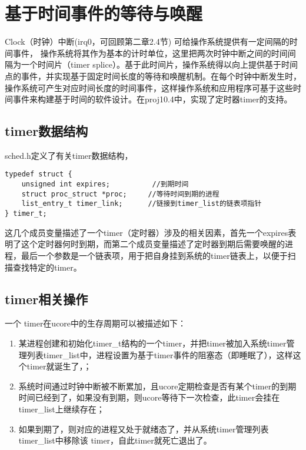 \section{基于时间事件的等待与唤醒}\label{ux57faux4e8eux65f6ux95f4ux4e8bux4ef6ux7684ux7b49ux5f85ux4e0eux5524ux9192}

Clock（时钟）中断(irq0，可回顾第二章2.4节)
可给操作系统提供有一定间隔的时间事件，
操作系统将其作为基本的计时单位，这里把两次时钟中断之间的时间间隔为一个时间片（timer
splice）。基于此时间片，操作系统得以向上提供基于时间点的事件，并实现基于固定时间长度的等待和唤醒机制。在每个时钟中断发生时，操作系统可产生对应时间长度的时间事件，这样操作系统和应用程序可基于这些时间事件来构建基于时间的软件设计。在proj10.4中，实现了定时器timer的支持。

\subsection{timer数据结构}\label{timerux6570ux636eux7ed3ux6784}

sched.h定义了有关timer数据结构，

\begin{lstlisting}
typedef struct {
    unsigned int expires;          //到期时间
    struct proc_struct *proc;     //等待时间到期的进程
    list_entry_t timer_link;      //链接到timer_list的链表项指针
} timer_t;
\end{lstlisting}

这几个成员变量描述了一个timer（定时器）涉及的相关因素，首先一个expires表明了这个定时器何时到期，而第二个成员变量描述了定时器到期后需要唤醒的进程，最后一个参数是一个链表项，用于把自身挂到系统的timer链表上，以便于扫描查找特定的timer。

\subsection{timer相关操作}\label{timerux76f8ux5173ux64cdux4f5c}

一个 timer在ucore中的生存周期可以被描述如下：

\begin{enumerate}
\def\labelenumi{\arabic{enumi}.}
\tightlist
\item
  某进程创建和初始化timer\_t结构的一个timer，并把timer被加入系统timer管理列表timer\_list中，进程设置为基于timer事件的阻塞态（即睡眠了），这样这个timer就诞生了，；
\item
  系统时间通过时钟中断被不断累加，且ucore定期检查是否有某个timer的到期时间已经到了，如果没有到期，则ucore等待下一次检查，此timer会挂在timer\_list上继续存在；
\item
  如果到期了，则对应的进程又处于就绪态了，并从系统timer管理列表timer\_list中移除该
  timer，自此timer就死亡退出了。
\end{enumerate}


